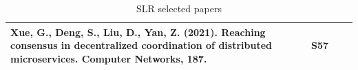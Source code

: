 \documentclass{article}
\begin{document}
\begin{appendices}
\begin{table}
\begin{center}
\begin{tabular}{ | m{20em} | m{1cm}| m{20em} | m{1cm} | }
\hline
Xue, G., Deng, S., Liu, D.,  Yan, Z. (2021). Reaching consensus in decentralized coordination of distributed microservices. Computer Networks, 187.                                                                                                                                                                                                       & S57            &                                                                                                                                                                                                                                                                                                                                                                                                                                &                 \\
\hline
\end{tabular}
\end{center}
\caption{SLR selected papers}
\label{table:1}
\end{table}
\end{appendices}
\end{document}
